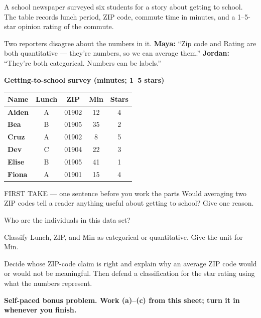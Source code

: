 \documentclass[14pt]{extarticle}
\begin{document}
\pagestyle{empty}


\noindent\begin{minipage}[t]{0.57\linewidth}
\vspace{0pt}
A school newspaper surveyed six students for a story about getting to school. The table records lunch period, ZIP code, commute time in minutes, and a 1--5-star opinion rating of the commute.\par\smallskip Two reporters disagree about the numbers in it. \textbf{Maya:} ``Zip code and Rating are both quantitative --- they're numbers, so we can average them.'' \textbf{Jordan:} ``They're both categorical. Numbers can be labels.''\par
\end{minipage}\hfill
\begin{minipage}[t]{0.40\linewidth}
\vspace{0pt}
\begin{center}
\textbf{Getting-to-school survey (minutes; 1--5 stars)}\par\smallskip
\begin{tabular}{|l|c|c|c|c|}
\hline
\textbf{Name} & \textbf{Lunch} & \textbf{ZIP} & \textbf{Min} & \textbf{Stars} \\ \hline
\textbf{Aiden} & A & 01902 & 12 & 4 \\ \hline
\textbf{Bea} & B & 01905 & 35 & 2 \\ \hline
\textbf{Cruz} & A & 01902 & 8 & 5 \\ \hline
\textbf{Dev} & C & 01904 & 22 & 3 \\ \hline
\textbf{Elise} & B & 01905 & 41 & 1 \\ \hline
\textbf{Fiona} & A & 01901 & 15 & 4 \\ \hline
\end{tabular}
\end{center}
\end{minipage}

\begin{firsttakebox}{FIRST TAKE --- one sentence before you work the parts}
Would averaging two ZIP codes tell a reader anything useful about getting to school? Give one reason.
\end{firsttakebox}

\begin{description}[leftmargin=1.15in, labelwidth=1in, itemsep=2pt, topsep=2pt]
  \item[\dokbadge{1}~(a)] Who are the individuals in this data set?
  \item[\dokbadge{2}~(b)] Classify Lunch, ZIP, and Min as categorical or quantitative. Give the unit for Min.
  \item[\dokbadge{3}~(c)] Decide whose ZIP-code claim is right and explain why an average ZIP code would or would not be meaningful. Then defend a classification for the star rating using what the numbers represent.
\end{description}

\vfill
\textbf{Self-paced bonus problem. Work (a)--(c) from this sheet; turn it in whenever you finish.}
\end{document}
